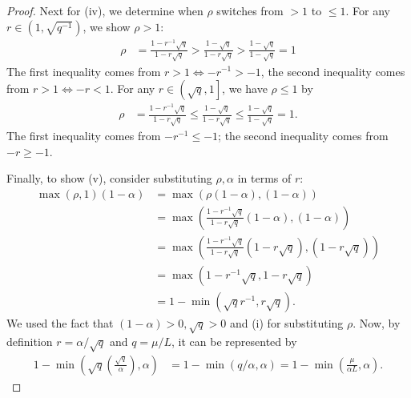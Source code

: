 \documentclass[12pt]{article}
\begin{document}
\begin{proof}
        Next for (iv), we determine when $\rho$ switches from $> 1$ to $ \le 1$.
        For any $r \in \left(1, \sqrt{q^{-1}}\right)$, we show $\rho > 1$:
        \begin{align*}
            \rho &= \frac{1 - r^{-1}\sqrt{q}}{1 - r \sqrt{q}}
            > \frac{1 - \sqrt{q}}{1 - r \sqrt{q}} > \frac{1 - \sqrt{q}}{1 - \sqrt{q}} = 1
        \end{align*}
        The first inequality comes from $r > 1 \iff -r^{-1} > -1$, the second inequality comes from $r > 1 \iff -r < 1$.
        For any $r \in \left(\sqrt{q}, 1\right]$, we have $\rho \le 1$ by
        \begin{align*}
            \rho &= \frac{1 - r^{-1}\sqrt{q}}{1 - r \sqrt{q}}
            \le \frac{1 - \sqrt{q}}{1 - r \sqrt{q}} \le \frac{1 - \sqrt{q}}{1 - \sqrt{q}} = 1.
        \end{align*}
        The first inequality comes from $-r^{-1} \le - 1$; the second inequality comes from $-r \ge -1$.
        \par
        Finally, to show (v), consider substituting $\rho, \alpha$ in terms of $r$:
        \begin{align*}
            \max(\rho, 1)(1 - \alpha) &=
            \max(\rho(1 - \alpha), (1 - \alpha))
            \\
            &= \max\left(
                \frac{1 - r^{-1}\sqrt{q}}{1 - r \sqrt{q}}(1 - \alpha), (1 - \alpha)
            \right)
            \\
            &=
            \max\left(
                \frac{1 - r^{-1}\sqrt{q}}{1 - r \sqrt{q}}(1 - r\sqrt{q}), (1 - r\sqrt{q})
            \right)
            \\
            &= \max\left(1 - r^{-1}\sqrt{q}, 1 - r \sqrt{q}\right)
            \\
            &= 1 - \min(\sqrt{q}r^{-1}, r\sqrt{q}).
        \end{align*}
        We used the fact that $(1 - \alpha) > 0, \sqrt{q} > 0$ and (i) for substituting $\rho$.
        Now, by definition $r = \alpha/\sqrt{q}$ and $q = \mu/L$, it can be represented by
        \begin{align*}
            1 - \min\left(
                \sqrt{q}\left(\frac{\sqrt{q}}{\alpha}\right), \alpha
            \right) &=
            1 - \min\left(
                q/\alpha, \alpha
            \right) =
            1 - \min\left(\frac{\mu}{\alpha L}, \alpha\right).
        \end{align*}
    \end{proof}
\end{document}
